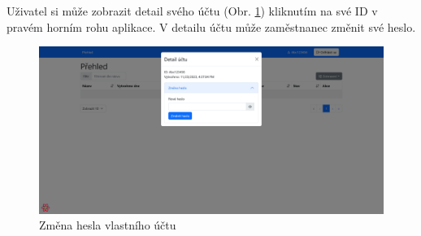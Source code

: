 Uživatel si může zobrazit detail svého účtu (Obr. \ref{fig:zmena-hesla-uzivatel}) kliknutím na své ID v pravém horním rohu aplikace.
V detailu účtu může zaměstnanec změnit své heslo.

\begin{figure}[H]
    \includegraphics[width=\textwidth]{../img/screenshots/zmena-hesla-uzivatel}
    \caption{Změna hesla vlastního účtu}\label{fig:zmena-hesla-uzivatel}
\end{figure}
